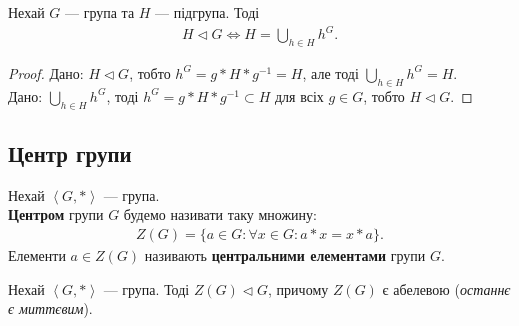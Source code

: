 \documentclass{math_library}
\begin{document}
\begin{proposition}
Нехай $G$ --- група та $H$ --- підгрупа. Тоді
\begin{align*}
H \triangleleft G \iff H = \displaystyle\bigcup_{h \in H} h^G.
\end{align*}
\end{proposition}

\begin{proof}
\rightproof Дано: $H \triangleleft G$, тобто $h^G = g*H*g^{-1} = H$, але тоді $\displaystyle\bigcup_{h \in H} h^G = H$.
\bigskip \\
\leftproof Дано: $\displaystyle\bigcup_{h \in H} h^G$, тоді $h^G = g*H*g^{-1} \subset H$ для всіх $g \in G$, тобто $H \triangleleft G$.
\end{proof}

\subsection{Центр групи}
\begin{definition}
Нехай $\left< G, *\right>$ --- група.\\
\textbf{Центром} групи $G$ будемо називати таку множину:
\begin{align*}
Z(G) = \{ a \in G: \forall x \in G: a*x = x*a\}.
\end{align*}
Елементи $a \in Z(G)$ називають \textbf{центральними елементами} групи $G$.
\end{definition}

\begin{proposition}
Нехай $\left< G,*\right>$ --- група. Тоді $Z(G) \triangleleft G$, причому $Z(G)$ є абелевою (\textit{останнє є миттєвим}).
\end{proposition}
\end{document}
